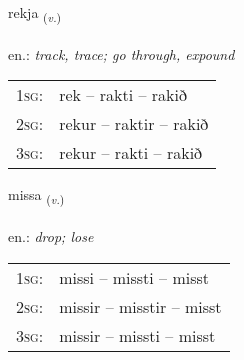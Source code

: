 \documentclass[frontgrid, backgrid]{flacards}\usepackage[]{graphicx}\usepackage[]{xcolor}
\begin{document}
\renewcommand{\flhead}{\vskip5pt \fboxsep=0pt {\small\bfseries\footnotesize Sagnorð | Verb}}
\renewcommand{\fcfoot}{\vskip5pt \fboxsep=0pt \hspace{2pt}{\small\bfseries\footnotesize 1K}}

\renewcommand{\blhead}{\vskip5pt {\small\bfseries\footnotesize Sagnorð | Verb }}
\renewcommand{\bcfoot}{\vskip5pt \hspace{2pt}{\small\bfseries\footnotesize 1K}}


{rekja \small{\textsubscript{(\textit{v.})}} \\[1ex] %
\textphonetic{[rɛːca]} \\
en.: \emph{track, trace; go through, expound} \\  [2ex]
\renewcommand*{\arraystretch}{0.8}
\begin{tabular}{p{1cm}l}
\textsc{1sg}: & rek -- rakti -- rakið \\ 
\textsc{2sg}: & rekur -- raktir -- rakið \\ 
\textsc{3sg}: & rekur -- rakti -- rakið \\ 
\end{tabular}
}

\renewcommand{\flhead}{\vskip5pt \fboxsep=0pt {\small\bfseries\footnotesize Sagnorð | Verb}}
\renewcommand{\fcfoot}{\vskip5pt \fboxsep=0pt \hspace{2pt}{\small\bfseries\footnotesize 1K}}

\renewcommand{\blhead}{\vskip5pt {\small\bfseries\footnotesize Sagnorð | Verb }}
\renewcommand{\bcfoot}{\vskip5pt \hspace{2pt}{\small\bfseries\footnotesize 1K}}


{missa \small{\textsubscript{(\textit{v.})}} \\[1ex] %
\textphonetic{[mɪsa]} \\
en.: \emph{drop; lose} \\  [2ex]
\renewcommand*{\arraystretch}{0.8}
\begin{tabular}{p{1cm}l}
\textsc{1sg}: & missi -- missti -- misst \\ 
\textsc{2sg}: & missir -- misstir -- misst \\ 
\textsc{3sg}: & missir -- missti -- misst \\ 
\end{tabular}
}
\end{document}

